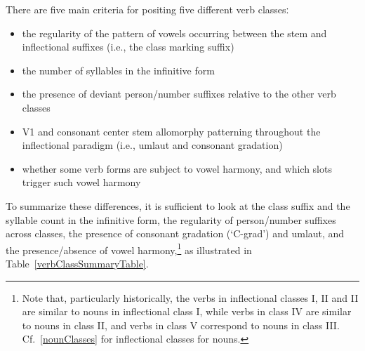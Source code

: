 There are five main criteria for positing five different verb classesː
\begin{itemize}
\item{the regularity of the pattern of vowels occurring between the stem and inflectional suffixes (i.e., the class marking suffix)}
\item{the number of syllables in the infinitive form}
\item{the presence of deviant person/number suffixes relative to the other verb classes}
\item{V1 and consonant center stem allomorphy patterning throughout the inflectional paradigm (i.e., umlaut and consonant gradation)}
\item{whether some verb forms are subject to vowel harmony, and which slots trigger such vowel harmony}
\end{itemize} 
To summarize these differences, it is sufficient to look at the class suffix and the syllable count in the infinitive form, the regularity of person/number suffixes across classes, the presence of consonant gradation (‘C-grad’) and umlaut, and the presence/absence of vowel harmony,\footnote{Note that, particularly historically, the verbs in inflectional classes I, II and II are similar to nouns in inflectional class I, while verbs in class IV are similar to nouns in class II, and verbs in class V correspond to nouns in class III. Cf.~\SEC\ref{nounClasses} for inflectional classes for nouns.} 
as illustrated in Table~\vref{verbClassSummaryTable}. %

